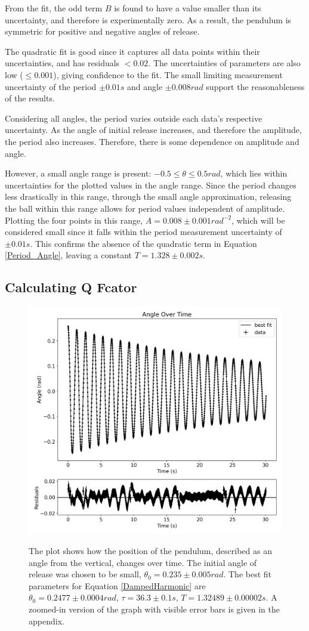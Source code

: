 \documentclass[12pt,twocolumn]{article}
\begin{document}
From the fit, the odd term $B$ is found to have a value smaller than its uncertainty,
and therefore is experimentally zero. As a result, the pendulum is symmetric for 
positive and negative angles of release.

The quadratic fit is good since it captures all data points within their uncertainties, and has 
residuals $< 0.02$. The uncertainties of parameters are also low ($\leq 0.001$), giving confidence to the fit.
The small limiting measurement uncertainty of the period $ \pm 0.01s$ and angle $\pm 0.008rad$ support the reasonableness of the results.

Considering all angles, the period varies outside each data's respective uncertainty. 
As the angle of initial release increases, and therefore the amplitude, the period also
increases. Therefore, there is some dependence on amplitude and angle.

However, a small angle range is present: $-0.5 \leq \theta
\leq 0.5 rad$, which lies within
uncertainties for the plotted values in the
angle range. Since the period changes less drastically in this range, through the small angle approximation, releasing the ball within this range allows for period 
values independent of amplitude. Plotting the four points in this range, $A = 0.008 \pm 0.001 rad^{-2}$, which will be considered small since it falls within the period measurement uncertainty of $\pm 0.01s$.
This confirms the absence of the quadratic term in Equation \ref{Period_Angle}, leaving a constant $T = 1.328 \pm 0.002 s$.

\subsection*{Calculating Q Fcator}

\begin{figure}[!h]
\begin{centering}
\includegraphics[width=0.5 \textwidth]{images/Angle Over Time.png}
\label{fig:AngleTime}
\caption{The plot shows how the position
of the pendulum, described as an angle from
the vertical, changes over time. The initial angle of release was chosen to be small,
$\theta_0 = 0.235\pm0.005 rad$.  
The best fit parameters for Equation \ref{DampedHarmonic} are
$\theta_0 = 0.2477 \pm 0.0004 rad$, $\tau = 36.3 \pm 0.1 s$, $T =
1.32489 \pm 0.00002s$. A zoomed-in version of the graph with visible error bars
is given in the appendix.
}
\end{centering}
\end{figure}
\end{document}

